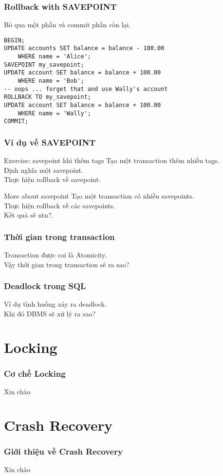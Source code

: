 \documentclass[xcolor={table, dvipsnames}]{beamer}
\begin{document}
\begin{frame}[fragile]
\frametitle{Rollback with SAVEPOINT}
Bỏ qua một phần và commit phần còn lại.\\
\pause
\begin{verbatim}
BEGIN;
UPDATE accounts SET balance = balance - 100.00
	WHERE name = 'Alice';
SAVEPOINT my_savepoint;
UPDATE account SET balance = balance + 100.00
	WHERE name = 'Bob';
-- oops ... forget that and use Wally's account
ROLLBACK TO my_savepoint;
UPDATE account SET balance = balance + 100.00
	WHERE name = 'Wally';
COMMIT;
\end{verbatim}
\end{frame}
\begin{frame}
\frametitle{Ví dụ về SAVEPOINT}
\begin{block}{Exercise: savepoint khi thêm tags}
Tạo một transaction thêm nhiều tags.\\
Định nghĩa một savepoint.\\
Thực hiện rollback về savepoint.\\
\end{block}
\pause
\begin{block}{More about savepoint}
Tạo một transaction có nhiều savepoints.\\
Thực hiện rollback về các savepoints.\\
Kết quả sẽ ntn?.
\end{block}
\end{frame}

\begin{frame}
\frametitle{Thời gian trong transaction}
Transaction được coi là Atomicity.\\
Vậy thời gian trong transaction sẽ ra sao?\\
\end{frame}

\begin{frame}
\frametitle{Deadlock trong SQL}
Ví dụ tình huống xảy ra deadlock.\\
Khi đó DBMS sẽ xử lý ra sao?\\
\end{frame}

\section{Locking}

\begin{frame}
\frametitle{Cơ chế Locking}

Xin chào

\end{frame}

\section{Crash Recovery}

\begin{frame}
\frametitle{Giới thiệu về Crash Recovery}

Xin chào

\end{frame}
\end{document}
